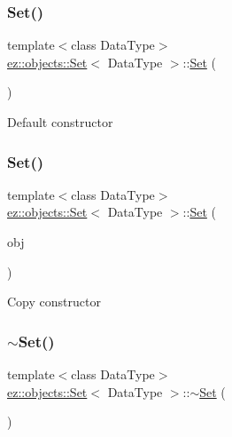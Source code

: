 \subsubsection{\texorpdfstring{Set()}{Set()}\hspace{0.1cm}{\footnotesize\ttfamily [1/2]}}
{\footnotesize\ttfamily template$<$class Data\+Type$>$ \\
\hyperlink{classez_1_1objects_1_1Set}{ez\+::objects\+::\+Set}$<$ Data\+Type $>$\+::\hyperlink{classez_1_1objects_1_1Set}{Set} (\begin{DoxyParamCaption}{ }\end{DoxyParamCaption})\hspace{0.3cm}{\ttfamily [inline]}}

Default constructor \mbox{\label{classez_1_1objects_1_1Set_a98c649d945406b540cc6b733b296227f}} 
\subsubsection{\texorpdfstring{Set()}{Set()}\hspace{0.1cm}{\footnotesize\ttfamily [2/2]}}
{\footnotesize\ttfamily template$<$class Data\+Type$>$ \\
\hyperlink{classez_1_1objects_1_1Set}{ez\+::objects\+::\+Set}$<$ Data\+Type $>$\+::\hyperlink{classez_1_1objects_1_1Set}{Set} (\begin{DoxyParamCaption}\item[{const \hyperlink{classez_1_1objects_1_1Set}{Set}$<$ Data\+Type $>$ \&}]{obj }\end{DoxyParamCaption})\hspace{0.3cm}{\ttfamily [inline]}}

Copy constructor \mbox{\label{classez_1_1objects_1_1Set_a14737e16cb0ebd77b9df7f6d76111149}} 
\subsubsection{\texorpdfstring{$\sim$\+Set()}{~Set()}}
{\footnotesize\ttfamily template$<$class Data\+Type$>$ \\
\hyperlink{classez_1_1objects_1_1Set}{ez\+::objects\+::\+Set}$<$ Data\+Type $>$\+::$\sim$\hyperlink{classez_1_1objects_1_1Set}{Set} (\begin{DoxyParamCaption}{ }\end{DoxyParamCaption})\hspace{0.3cm}{\ttfamily [inline]}}

